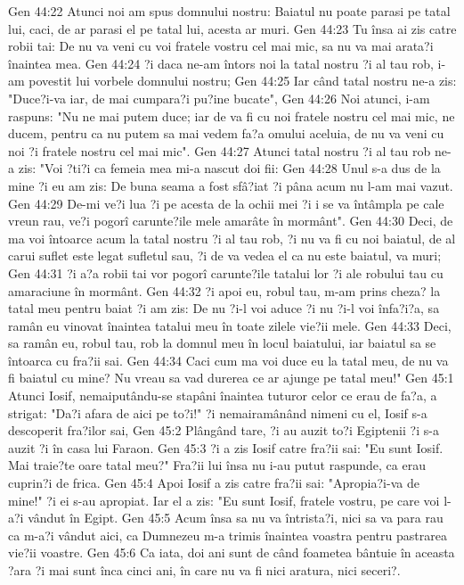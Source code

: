 Gen 44:22  Atunci noi am spus domnului nostru: Baiatul nu poate parasi pe tatal lui, caci, de ar parasi el pe tatal lui, acesta ar muri.
Gen 44:23  Tu însa ai zis catre robii tai: De nu va veni cu voi fratele vostru cel mai mic, sa nu va mai arata?i înaintea mea.
Gen 44:24  ?i daca ne-am întors noi la tatal nostru ?i al tau rob, i-am povestit lui vorbele domnului nostru;
Gen 44:25  Iar când tatal nostru ne-a zis: "Duce?i-va iar, de mai cumpara?i pu?ine bucate",
Gen 44:26  Noi atunci, i-am raspuns: "Nu ne mai putem duce; iar de va fi cu noi fratele nostru cel mai mic, ne ducem, pentru ca nu putem sa mai vedem fa?a omului aceluia, de nu va veni cu noi ?i fratele nostru cel mai mic".
Gen 44:27  Atunci tatal nostru ?i al tau rob ne-a zis: "Voi ?ti?i ca femeia mea mi-a nascut doi fii:
Gen 44:28  Unul s-a dus de la mine ?i eu am zis: De buna seama a fost sfâ?iat ?i pâna acum nu l-am mai vazut.
Gen 44:29  De-mi ve?i lua ?i pe acesta de la ochii mei ?i i se va întâmpla pe cale vreun rau, ve?i pogorî carunte?ile mele amarâte în mormânt".
Gen 44:30  Deci, de ma voi întoarce acum la tatal nostru ?i al tau rob, ?i nu va fi cu noi baiatul, de al carui suflet este legat sufletul sau, ?i de va vedea el ca nu este baiatul, va muri;
Gen 44:31  ?i a?a robii tai vor pogorî carunte?ile tatalui lor ?i ale robului tau cu amaraciune în mormânt.
Gen 44:32  ?i apoi eu, robul tau, m-am prins cheza? la tatal meu pentru baiat ?i am zis: De nu ?i-l voi aduce ?i nu ?i-l voi înfa?i?a, sa ramân eu vinovat înaintea tatalui meu în toate zilele vie?ii mele.
Gen 44:33  Deci, sa ramân eu, robul tau, rob la domnul meu în locul baiatului, iar baiatul sa se întoarca cu fra?ii sai.
Gen 44:34  Caci cum ma voi duce eu la tatal meu, de nu va fi baiatul cu mine? Nu vreau sa vad durerea ce ar ajunge pe tatal meu!"
Gen 45:1  Atunci Iosif, nemaiputându-se stapâni înaintea tuturor celor ce erau de fa?a, a strigat: "Da?i afara de aici pe to?i!" ?i nemairamânând nimeni cu el, Iosif s-a descoperit fra?ilor sai,
Gen 45:2  Plângând tare, ?i au auzit to?i Egiptenii ?i s-a auzit ?i în casa lui Faraon.
Gen 45:3  ?i a zis Iosif catre fra?ii sai: "Eu sunt Iosif. Mai traie?te oare tatal meu?" Fra?ii lui însa nu i-au putut raspunde, ca erau cuprin?i de frica.
Gen 45:4  Apoi Iosif a zis catre fra?ii sai: "Apropia?i-va de mine!" ?i ei s-au apropiat. Iar el a zis: "Eu sunt Iosif, fratele vostru, pe care voi l-a?i vândut în Egipt.
Gen 45:5  Acum însa sa nu va întrista?i, nici sa va para rau ca m-a?i vândut aici, ca Dumnezeu m-a trimis înaintea voastra pentru pastrarea vie?ii voastre.
Gen 45:6  Ca iata, doi ani sunt de când foametea bântuie în aceasta ?ara ?i mai sunt înca cinci ani, în care nu va fi nici aratura, nici seceri?.
